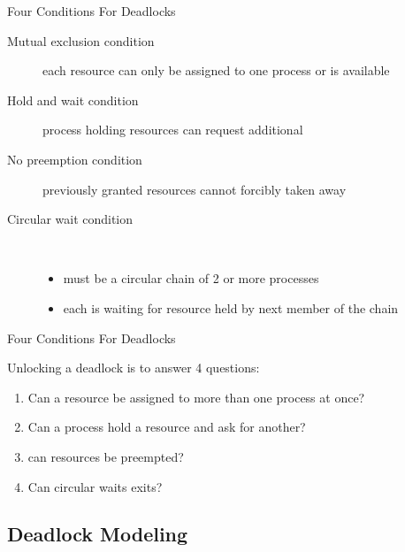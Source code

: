 \begin{frame}{Four Conditions For Deadlocks}
  \begin{description}
  \item[Mutual exclusion condition] each resource can only be assigned to one process or is available
  \item[Hold and wait condition] process holding resources can request additional
  \item[No preemption condition] previously granted resources cannot forcibly taken away
  \item[Circular wait condition] \ 
    \begin{itemize}
    \item must be a circular chain of 2 or more processes
    \item each is waiting for resource held by next member of the chain
    \end{itemize}
  \end{description}
\end{frame}

\begin{frame}{Four Conditions For Deadlocks}
  \begin{block}{Unlocking a deadlock is to answer 4 questions:}
  \begin{enumerate}
  \item Can a resource be assigned to more than one process at once?
  \item Can a process hold a resource and ask for another?
  \item can resources be preempted?
  \item Can circular waits exits?
  \end{enumerate}    
  \end{block}
\end{frame}

\subsection{Deadlock Modeling}
\label{sec:deadlock-modeling}

